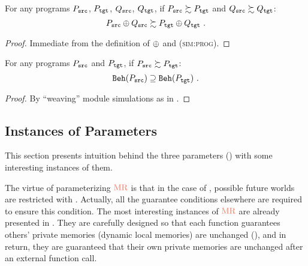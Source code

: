 \begin{theorem}[HorComp]
  For any programs $P_{\texttt{src}}$, $P_{\texttt{tgt}}$, $Q_{\texttt{src}}$, $Q_{\texttt{tgt}}$, if $P_{\texttt{src}} \succsim P_{\texttt{tgt}}$ and
  $Q_{\texttt{src}} \succsim Q_{\texttt{tgt}}$:
  \[
  \vspace{-0.8mm}
  P_\src \llink Q_\src \succsim P_\tgt \llink Q_\tgt~.
  \vspace{-0.8mm}
  \]
\end{theorem}
\begin{proof} Immediate from the definition of $\oplus$ and \textsc{(sim:prog)}.
\end{proof}
\begin{theorem}[Adequacy]
  For any programs $P_{\texttt{src}}$ and $P_{\texttt{tgt}}$, if $P_{\texttt{src}} \succsim P_{\texttt{tgt}}$:
  \[
  \vspace{-0.8mm}
  \beh{P_\src} \supseteq \beh{P_\tgt}~.
  \vspace{-0.8mm}
  \]
\end{theorem}
\begin{proof} By ``weaving'' module simulations as in \cite{pb}.
\end{proof}



\subsection{Instances of Parameters}
\label{sec:main-verification:instances}

This section presents intuition behind the three parameters () with some interesting instances of them.

The virtue of parameterizing $\MREL$ is that in the  case of ,
possible future worlds are restricted with .
Actually, all the guarantee conditions  elsewhere are required to ensure this condition.
The most interesting instances of $\MREL$ are already presented in .
They are carefully designed so that each function guarantees others' private memories (\eg dynamic local memories) are unchanged (), and in return, they are guaranteed that their own private memories are unchanged after an external function call.

